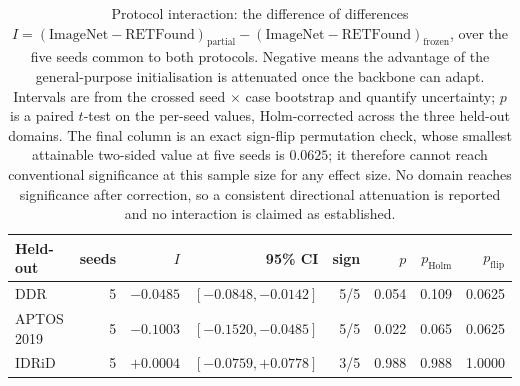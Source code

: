 \begin{table}[t]
\centering
\caption{Protocol interaction: the difference of differences $I = (\text{ImageNet}-\text{RETFound})_{\text{partial}} - (\text{ImageNet}-\text{RETFound})_{\text{frozen}}$, over the five seeds common to both protocols. Negative means the advantage of the general-purpose initialisation is attenuated once the backbone can adapt. Intervals are from the crossed seed $\times$ case bootstrap and quantify uncertainty; $p$ is a paired $t$-test on the per-seed values, Holm-corrected across the three held-out domains. The final column is an exact sign-flip permutation check, whose smallest attainable two-sided value at five seeds is $0.0625$; it therefore cannot reach conventional significance at this sample size for any effect size. No domain reaches significance after correction, so a consistent directional attenuation is reported and no interaction is claimed as established.}
\label{tab:interaction}
\begin{tabular}{lrrrrrrr}
\toprule
Held-out & seeds & $I$ & 95\% CI & sign & $p$ & $p_{\text{Holm}}$ & $p_{\text{flip}}$ \\
\midrule
DDR & 5 & $-0.0485$ & $[-0.0848, -0.0142]$ & 5/5 & 0.054 & 0.109 & 0.0625 \\
APTOS 2019 & 5 & $-0.1003$ & $[-0.1520, -0.0485]$ & 5/5 & 0.022 & 0.065 & 0.0625 \\
IDRiD & 5 & $+0.0004$ & $[-0.0759, +0.0778]$ & 3/5 & 0.988 & 0.988 & 1.0000 \\
\bottomrule
\end{tabular}
\end{table}
